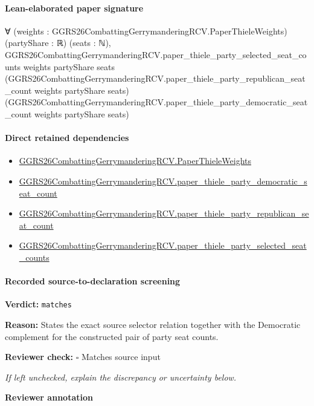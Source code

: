 \documentclass[10pt]{article}
\newcommand{\reviewerbox}{%
  \par\noindent\fbox{\parbox{0.96\linewidth}{\rule{0pt}{0.38in}}}\par
}
\newcommand{\reviewmatch}[1]{%
  \par\noindent\textbf{Reviewer check:} $\square$\; #1\par
  \noindent\emph{If left unchecked, explain the discrepancy or uncertainty below.}\par
}
\begin{document}
\paragraph{Lean-elaborated paper signature}
\begin{ReviewVerbatim}
∀ (weights : GGRS26CombattingGerrymanderingRCV.PaperThieleWeights) (partyShare : ℝ) (seats : ℕ),
  GGRS26CombattingGerrymanderingRCV.paper_thiele_party_selected_seat_counts weights partyShare seats
    (GGRS26CombattingGerrymanderingRCV.paper_thiele_party_republican_seat_count weights partyShare seats)
    (GGRS26CombattingGerrymanderingRCV.paper_thiele_party_democratic_seat_count weights partyShare seats)
\end{ReviewVerbatim}

\paragraph{Direct retained dependencies}
\begin{itemize}\raggedright
\item \hyperlink{paper-prerequisite-37b91baa3b4ddc9d}{GGRS26\allowbreak{}Combatting\allowbreak{}Gerrymandering\allowbreak{}RCV.\allowbreak{}Paper\allowbreak{}Thiele\allowbreak{}Weights}
\item \hyperlink{paper-prerequisite-f7db6c9d33a2a094}{GGRS26\allowbreak{}Combatting\allowbreak{}Gerrymandering\allowbreak{}RCV.\allowbreak{}paper\_\allowbreak{}thiele\_\allowbreak{}party\_\allowbreak{}democratic\_\allowbreak{}seat\_\allowbreak{}count}
\item \hyperlink{paper-prerequisite-5fa565502cdaaed9}{GGRS26\allowbreak{}Combatting\allowbreak{}Gerrymandering\allowbreak{}RCV.\allowbreak{}paper\_\allowbreak{}thiele\_\allowbreak{}party\_\allowbreak{}republican\_\allowbreak{}seat\_\allowbreak{}count}
\item \hyperlink{paper-prerequisite-1ce27606523bc987}{GGRS26\allowbreak{}Combatting\allowbreak{}Gerrymandering\allowbreak{}RCV.\allowbreak{}paper\_\allowbreak{}thiele\_\allowbreak{}party\_\allowbreak{}selected\_\allowbreak{}seat\_\allowbreak{}counts}
\end{itemize}
\paragraph{Recorded source-to-declaration screening}
\textbf{Verdict:} \texttt{matches}
\\
{\raggedright
\textbf{Reason:} States the exact source selector relation together with the Democratic complement for the constructed pair of party seat counts.\allowbreak{}
\par}
\reviewmatch{Matches source input}
\noindent\textbf{Reviewer annotation}\par
\reviewerbox
\clearpage
\hypertarget{paper-prerequisite-aea2ad46d27b40e1}{}
\end{document}
